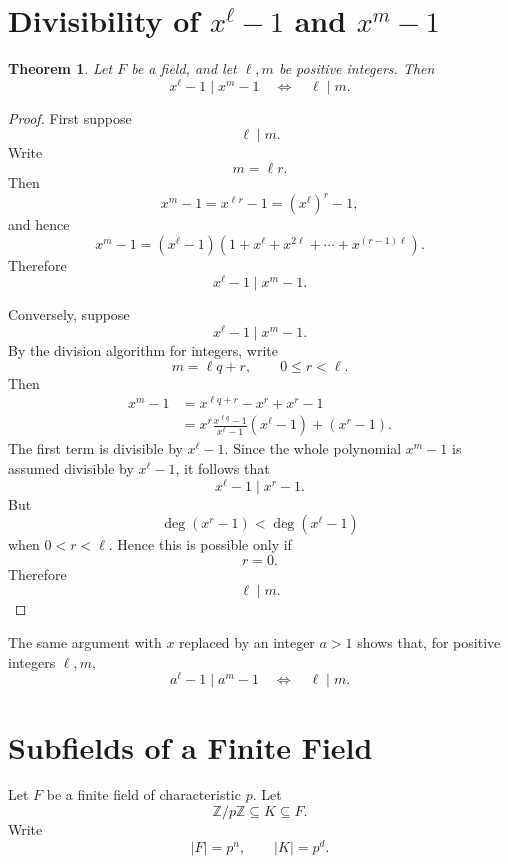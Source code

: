 \documentclass[11pt]{article}
\newtheorem{theorem}{Theorem}[section]
\theoremstyle{remark}
\newcommand{\Z}{\mathbb Z}
\newcommand{\divides}{\mid}
\begin{document}
\section{Divisibility of $x^\ell-1$ and $x^m-1$}

\begin{theorem}
Let $F$ be a field, and let $\ell,m$ be positive integers. Then
\[
    \boxed{
    x^\ell-1\divides x^m-1
    \quad\Longleftrightarrow\quad
    \ell\mid m.
    }
\]
\end{theorem}

\begin{proof}
First suppose
\[
    \ell\mid m.
\]
Write
\[
    m=\ell r.
\]
Then
\[
    x^m-1
    =
    x^{\ell r}-1
    =
    (x^\ell)^r-1,
\]
and hence
\[
    x^m-1
    =
    (x^\ell-1)
    \left(
        1+x^\ell+x^{2\ell}+\cdots+x^{(r-1)\ell}
    \right).
\]
Therefore
\[
    x^\ell-1\divides x^m-1.
\]

Conversely, suppose
\[
    x^\ell-1\divides x^m-1.
\]
By the division algorithm for integers, write
\[
    m=\ell q+r,
    \qquad
    0\le r<\ell.
\]
Then
\begin{align*}
    x^m-1
    &=
    x^{\ell q+r}-x^r+x^r-1\\
    &=
    x^r\frac{x^{\ell q}-1}{x^\ell-1}(x^\ell-1)
    +(x^r-1).
\end{align*}
The first term is divisible by $x^\ell-1$. Since the whole polynomial
$x^m-1$ is assumed divisible by $x^\ell-1$, it follows that
\[
    x^\ell-1\divides x^r-1.
\]
But
\[
    \deg(x^r-1)<\deg(x^\ell-1)
\]
when $0<r<\ell$. Hence this is possible only if
\[
    r=0.
\]
Therefore
\[
    \ell\mid m.
\]
\end{proof}

The same argument with $x$ replaced by an integer $a>1$ shows that, for
positive integers $\ell,m$,
\[
    a^\ell-1\mid a^m-1
    \quad\Longleftrightarrow\quad
    \ell\mid m.
\]

\section{Subfields of a Finite Field}

Let $F$ be a finite field of characteristic $p$. Let
\[
    \Z/p\Z\subseteq K\subseteq F.
\]
Write
\[
    |F|=p^n,
    \qquad
    |K|=p^d.
\]
\end{document}
